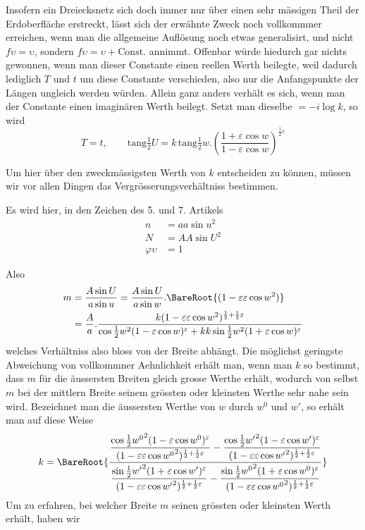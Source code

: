 \par\indent{}%
Insofern ein Dreiecksnetz sich doch immer nur über einen sehr mässigen Theil der Erdoberfläche erstreckt, lässt sich der erwähnte Zweck noch vollkommner erreichen, wenn man die allgemeine Auflösung noch etwas generalisirt, und nicht \(f\upsilon=\upsilon\), sondern \(f\upsilon=\upsilon+\text{Const.}\) annimmt. Offenbar würde hiedurch gar nichts gewonnen, wenn man dieser Constante einen reellen Werth beilegte, weil dadurch lediglich \(T\) und \(t\) um diese Constante verschieden, also nur die Anfangspunkte der Längen ungleich werden würden. Allein ganz anders verhält es sich, wenn man der Constante einen imaginären Werth beilegt. Setzt man dieselbe \(=-i\log k\), so wird
\[
T=t,\qquad \mathrm{tang}\tfrac{1}{2}U=k\,\mathrm{tang}\tfrac{1}{2}w\mathord{.}(\frac{1+\varepsilon\cos w}{1-\varepsilon\cos w})^{\frac{1}{2}\varepsilon}
\]
\par\indent Um hier über den zweckmässigsten Werth von \(k\) entscheiden zu können, müssen wir vor allen Dingen das Vergrösserungsverhältniss bestimmen.

Es wird hier, in den Zeichen des 5. und 7. Artikels
\[
\begin{aligned}
n&=aa\sin u^2\\
N&=AA\sin U^2\\
\varphi\upsilon&=1
\end{aligned}
\]
\par\indent Also
\[
\begin{aligned}
m&=\frac{A\sin U}{a\sin u}=\frac{A\sin U}{a\sin w}\mathord{.}\BareRoot{(1-\varepsilon\varepsilon\cos w^2)}\\
&=\frac{A}{a}\mathord{.}\frac{k(1-\varepsilon\varepsilon\cos w^2)^{\frac{1}{2}+\frac{1}{2}\varepsilon}}{\cos\frac{1}{2}w^2(1-\varepsilon\cos w)^{\varepsilon}+kk\sin\frac{1}{2}w^2(1+\varepsilon\cos w)^{\varepsilon}}
\end{aligned}
\]
\noindent welches Verhältniss also bloss von der Breite abhängt. Die möglichst geringste Abweichung von vollkommner Aehnlichkeit erhält man, wenn man \(k\) so bestimmt, dass \(m\) für die äussersten Breiten gleich grosse Werthe erhält, wodurch von selbst \(m\) bei der mittlern Breite seinem grössten oder kleinsten Werthe sehr nahe sein wird. Bezeichnet man die äussersten Werthe von \(w\) durch \(w^0\) und \(w'\), so erhält man auf diese Weise
\[
k=\BareRoot{\frac{\displaystyle\frac{\cos\frac{1}{2}{w^0}^{2}(1-\varepsilon\cos w^0)^{\varepsilon}}{(1-\varepsilon\varepsilon\cos {w^0}^{2})^{\frac{1}{2}+\frac{1}{2}\varepsilon}}-\frac{\cos\frac{1}{2}{w'}^{2}(1-\varepsilon\cos w')^{\varepsilon}}{(1-\varepsilon\varepsilon\cos {w'}^{2})^{\frac{1}{2}+\frac{1}{2}\varepsilon}}}{\displaystyle\frac{\sin\frac{1}{2}{w'}^{2}(1+\varepsilon\cos w')^{\varepsilon}}{(1-\varepsilon\varepsilon\cos {w'}^{2})^{\frac{1}{2}+\frac{1}{2}\varepsilon}}-\frac{\sin\frac{1}{2}{w^0}^{2}(1+\varepsilon\cos w^0)^{\varepsilon}}{(1-\varepsilon\varepsilon\cos {w^0}^{2})^{\frac{1}{2}+\frac{1}{2}\varepsilon}}}}
\]
\noindent Um zu erfahren, bei welcher Breite \(m\) seinen grössten oder kleinsten Werth erhält, haben wir
